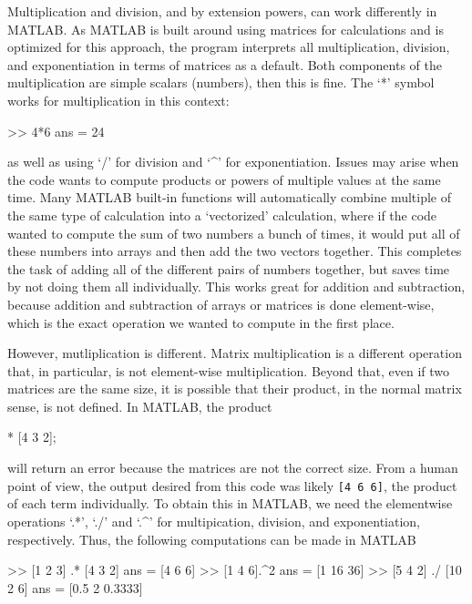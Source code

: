 Multiplication and division, and by extension powers, can work differently in MATLAB. As MATLAB is built around using matrices for calculations and is optimized for this approach, the program interprets all multiplication, division, and exponentiation in terms of matrices as a default. Both components of the multiplication are simple scalars (numbers), then this is fine. The `*' symbol works for multiplication in this context:
\begin{matlab}
>> 4*6
ans = 
    24
\end{matlab}
as well as using `/' for division and `\^{ }' for exponentiation. Issues may arise when the code wants to compute products or powers of multiple values at the same time. Many MATLAB built-in functions will automatically combine multiple of the same type of calculation into a `vectorized' calculation, where if the code wanted to compute the sum of two numbers a bunch of times, it would put all of these numbers into arrays and then add the two vectors together. This completes the task of adding all of the different pairs of numbers together, but saves time by not doing them all individually. This works great for addition and subtraction, because addition and subtraction of arrays or matrices is done element-wise, which is the exact operation we wanted to compute in the first place.

However, mutliplication is different. Matrix multiplication is a different operation that, in particular, is not element-wise multiplication. Beyond that, even if two matrices are the same size, it is possible that their product, in the normal matrix sense, is not defined. In MATLAB, the product
\begin{matlab}
[1 2 3] * [4 3 2];
\end{matlab}
will return an error because the matrices are not the correct size. From a human point of view, the output desired from this code was likely \texttt{[4 6 6]}, the product of each term individually. To obtain this in MATLAB, we need the elementwise operations `.*', `./' and `.\^{ }' for multipication, division, and exponentiation, respectively. Thus, the following computations can be made in MATLAB
\begin{matlab}
>> [1 2 3] .* [4 3 2]
ans = 
   [4 6 6]
>> [1 4 6].^2
ans = 
    [1 16 36]
>> [5 4 2] ./ [10 2 6]
ans = 
    [0.5 2 0.3333]
\end{matlab}

